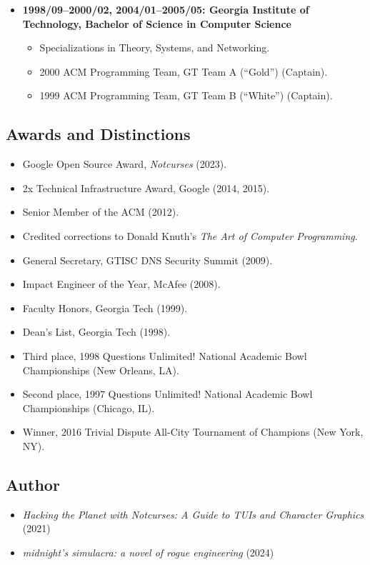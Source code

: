 \documentclass{article}
\newenvironment{tightitemize}
{\begin{itemize}
  \setlength{\itemsep}{1pt}
  \setlength{\parskip}{0pt}
  \setlength{\parsep}{0pt}}
{\end{itemize}}
\begin{document}
\begin{tightitemize}
\item \textbf{1998/09--2000/02, 2004/01--2005/05: Georgia Institute of Technology,
Bachelor of Science in Computer Science}
\begin{tightitemize}
\item Specializations in Theory, Systems, and Networking.
\item 2000 ACM Programming Team, GT Team A (``Gold'') (Captain).
\item 1999 ACM Programming Team, GT Team B (``White'') (Captain).
\end{tightitemize}
\end{tightitemize}

\vspace{2mm}
\subsection*{Awards and Distinctions}
\begin{tightitemize}
\item Google Open Source Award, \textit{Notcurses} (2023).
\item 2x Technical Infrastructure Award, Google (2014, 2015).
\item Senior Member of the ACM (2012).
\item Credited corrections to Donald Knuth's \textit{The Art of Computer Programming}.
\item General Secretary, GTISC DNS Security Summit (2009).
\item Impact Engineer of the Year, McAfee (2008).
\item Faculty Honors, Georgia Tech (1999).
\item Dean's List, Georgia Tech (1998).
\item Third place, 1998 Questions Unlimited! National Academic Bowl Championships (New Orleans, LA).
\item Second place, 1997 Questions Unlimited! National Academic Bowl Championships (Chicago, IL).
\item Winner, 2016 Trivial Dispute All-City Tournament of Champions (New York, NY).
\end{tightitemize}

\vspace{2mm}
\subsection*{Author}
\begin{tightitemize}
\item \textit{Hacking the Planet with Notcurses: A Guide to TUIs and Character Graphics} (2021)
\item \textit{midnight's simulacra: a novel of rogue engineering} (2024)
\end{tightitemize}
\end{document}
